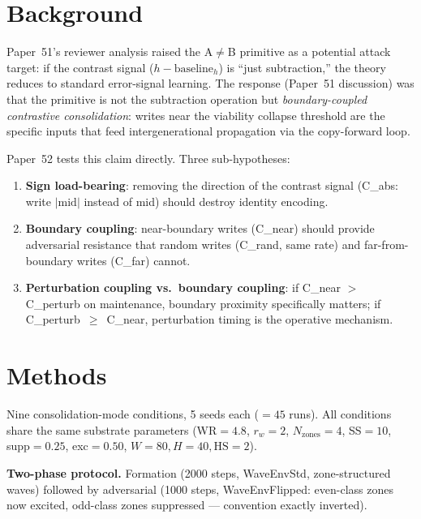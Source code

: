 \documentclass[11pt,a4paper]{article}
\begin{document}
\section{Background}

Paper~51's reviewer analysis raised the A$\neq$B primitive as a potential
attack target: if the contrast signal ($h - \text{baseline}_h$) is ``just
subtraction,'' the theory reduces to standard error-signal learning.
The response (Paper~51 discussion) was that the primitive is not the subtraction
operation but \emph{boundary-coupled contrastive consolidation}:
writes near the viability collapse threshold are the specific inputs that feed
intergenerational propagation via the copy-forward loop.

Paper~52 tests this claim directly.
Three sub-hypotheses:
\begin{enumerate}
  \item \textbf{Sign load-bearing}: removing the direction of the contrast signal
    (C\_abs: write $|\mathrm{mid}|$ instead of mid) should destroy identity encoding.
  \item \textbf{Boundary coupling}: near-boundary writes (C\_near) should provide
    adversarial resistance that random writes (C\_rand, same rate) and
    far-from-boundary writes (C\_far) cannot.
  \item \textbf{Perturbation coupling vs.\ boundary coupling}: if C\_near $>$ C\_perturb
    on maintenance, boundary proximity specifically matters; if C\_perturb~$\geq$~C\_near,
    perturbation timing is the operative mechanism.
\end{enumerate}

\section{Methods}

Nine consolidation-mode conditions, 5 seeds each ($=45$ runs).
All conditions share the same substrate parameters
(WR$=4.8$, $r_w=2$, $N_\mathrm{zones}=4$, SS$=10$, supp$=0.25$, exc$=0.50$,
$W=80, H=40, \mathrm{HS}=2$).

\textbf{Two-phase protocol.}
Formation (2000 steps, WaveEnvStd, zone-structured waves) followed by
adversarial (1000 steps, WaveEnvFlipped: even-class zones now excited,
odd-class zones suppressed --- convention exactly inverted).
\end{document}
